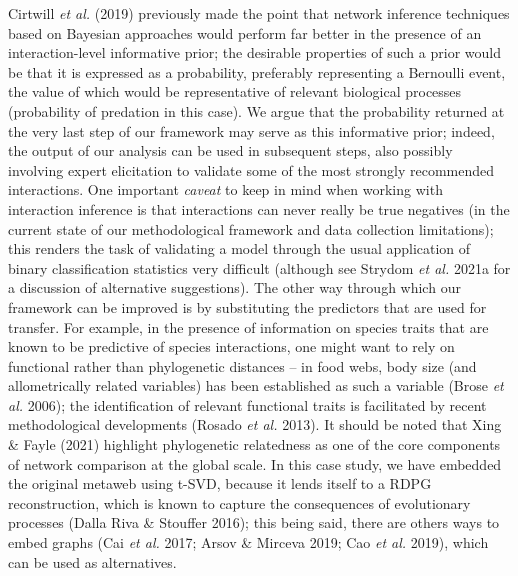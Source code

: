 \documentclass[11pt]{article}
\begin{document}
Cirtwill \emph{et al.} (2019) previously made the point that network
inference techniques based on Bayesian approaches would perform far
better in the presence of an interaction-level informative prior; the
desirable properties of such a prior would be that it is expressed as a
probability, preferably representing a Bernoulli event, the value of
which would be representative of relevant biological processes
(probability of predation in this case). We argue that the probability
returned at the very last step of our framework may serve as this
informative prior; indeed, the output of our analysis can be used in
subsequent steps, also possibly involving expert elicitation to validate
some of the most strongly recommended interactions. One important
\emph{caveat} to keep in mind when working with interaction inference is
that interactions can never really be true negatives (in the current
state of our methodological framework and data collection limitations);
this renders the task of validating a model through the usual
application of binary classification statistics very difficult (although
see Strydom \emph{et al.} 2021a for a discussion of alternative
suggestions). The other way through which our framework can be improved
is by substituting the predictors that are used for transfer. For
example, in the presence of information on species traits that are known
to be predictive of species interactions, one might want to rely on
functional rather than phylogenetic distances -- in food webs, body size
(and allometrically related variables) has been established as such a
variable (Brose \emph{et al.} 2006); the identification of relevant
functional traits is facilitated by recent methodological developments
(Rosado \emph{et al.} 2013). It should be noted that Xing \& Fayle
(2021) highlight phylogenetic relatedness as one of the core components
of network comparison at the global scale. In this case study, we have
embedded the original metaweb using t-SVD, because it lends itself to a
RDPG reconstruction, which is known to capture the consequences of
evolutionary processes (Dalla Riva \& Stouffer 2016); this being said,
there are others ways to embed graphs (Cai \emph{et al.} 2017; Arsov \&
Mirceva 2019; Cao \emph{et al.} 2019), which can be used as
alternatives.
\end{document}
